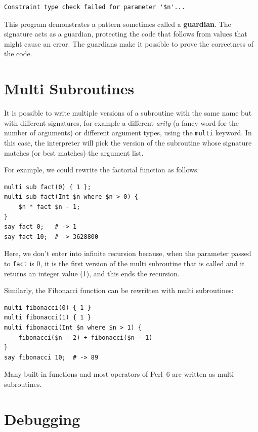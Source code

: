 \begin{verbatim}
Constraint type check failed for parameter '$n'...
\end{verbatim}

This program demonstrates a pattern sometimes called a {\bf guardian}.
The signature acts as a guardian, protecting the code that
follows from values that might cause an error.  The guardians make it
possible to prove the correctness of the code.


\section{Multi Subroutines}
\label{multisubs}

It is possible to write multiple versions of a subroutine 
with the same name but with different signatures, for example  
a different \emph{arity} (a fancy word for the number of 
arguments) or different argument types, using the 
{\tt multi} keyword. In this case, the interpreter will 
pick the version of the subroutine whose signature 
matches (or best matches) the argument list.

For example, we could rewrite the factorial function 
as follows:

\begin{verbatim}
multi sub fact(0) { 1 };
multi sub fact(Int $n where $n > 0) {
    $n * fact $n - 1;
}
say fact 0;   # -> 1
say fact 10;  # -> 3628800
\end{verbatim}

Here, we don't enter into infinite recursion because, when 
the parameter passed to {\tt fact} is 0, it is the first 
version of the multi subroutine that is called and it returns 
an integer value (1), and this ends the recursion.

Similarly, the Fibonacci function can be rewritten with 
multi subroutines:

\begin{verbatim}
multi fibonacci(0) { 1 }
multi fibonacci(1) { 1 }
multi fibonacci(Int $n where $n > 1) { 
    fibonacci($n - 2) + fibonacci($n - 1) 
}
say fibonacci 10;  # -> 89
\end{verbatim}

Many built-in functions and most operators of Perl~6 are 
written as multi subroutines.

\section{Debugging}
\label{factdebug}

